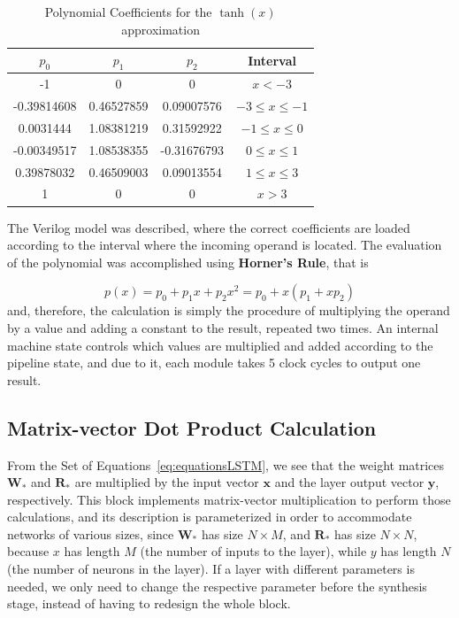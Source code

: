 \documentclass{IEEEtran}
\newcommand{\mb}[1]{\mathbf{#1}}
\begin{document}
\begin{table}
	\caption{Polynomial Coefficients for the $\tanh(x)$ approximation}
	\label{tab:coefs-tanh}
    \centering
  \begin{tabular}{ | c | c | c | c | }
    \hline
    $p_0$      &  $p_1$     &  $p_2$        &  Interval  \\
		\hline
    -1          & 0          &  0             & $x < -3$ \\
    \hline
    -0.39814608 & 0.46527859 &  0.09007576   & $-3 \leq x \leq -1$ \\
    \hline
		0.0031444 & 1.08381219 & 0.31592922      & $-1 \leq  x \leq 0$ \\
		\hline
		-0.00349517 & 1.08538355 & -0.31676793   &  $0 \leq  x \leq 1$ \\
		\hline
		0.39878032 & 0.46509003 & 0.09013554     & $1 \leq  x \leq 3$ \\
		\hline
		1         &  0         &   0             & $x > 3$ \\
		\hline
  \end{tabular}
\end{table}
The Verilog model was described, where the correct
coefficients are loaded according to the interval where the incoming operand is located. The evaluation of the polynomial
was accomplished using \textbf{Horner's Rule}, that is

\begin{equation}\label{eq:factorPol}
p(x) = p_0 + p_1x + p_2x^2 = p_0 + x(p_1 + xp_2)
\end{equation}
and, therefore, the calculation is simply the procedure of multiplying the operand by a value and adding a constant to the result,
repeated two times. An internal machine state controls which values are multiplied and added according to the pipeline state, and due to it,
each module takes 5 clock cycles to output one result.


\subsection{Matrix-vector Dot Product Calculation}\label{sec:proprarch_dot}
From the Set of Equations~\ref{eq:equationsLSTM}, we see that the weight matrices $\mb{W}_*$ and $\mb{R}_*$ are
multiplied by the input vector $\mb{x}$ and the layer output vector $\mb{y}$, respectively. This block implements
matrix-vector multiplication to perform those calculations, and its description is parameterized in
order to accommodate networks of various sizes, since $\mb{W}_*$ has size $N\times M$, and $\mb{R}_*$
has size $N\times N$, because $x$ has length $M$ (the number of inputs to the layer), while $y$ has length $N$
(the number of neurons in the layer). If a layer with different parameters is needed, we only need to change the respective parameter before the synthesis stage,
instead of having to redesign the whole block.
\end{document}
